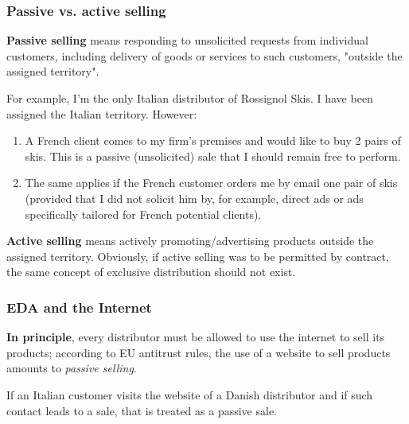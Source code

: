     \subsubsection{Passive vs. active selling}
    
        \textbf{Passive selling} means responding to unsolicited requests from individual customers, including delivery of goods or services to such customers, "outside the assigned territory".
        
        For example, I’m the only Italian distributor of Rossignol Skis. I have been assigned the Italian territory. However:
        
        \begin{enumerate}[label=\alph*.]
            \item A French client comes to my firm’s premises and would like to buy 2 pairs of skis. This is a passive (unsolicited) sale that I should remain free to perform.
            \item The same applies if the French customer orders me by email one pair of skis (provided that I did not solicit him by, for example, direct ads or ads specifically tailored for French potential clients).
        \end{enumerate}
        
        \medskip

\noindent
        \textbf{Active selling} means actively promoting/advertising products outside the assigned territory. Obviously, if active selling was to be permitted by contract, the same concept of exclusive distribution should not exist.
        
        
    \subsubsection{EDA and the Internet}

        \textbf{In principle}, every distributor must be allowed to use the internet to sell its products; according to EU antitrust rules, the use of a website to sell products amounts to \emph{passive selling}.
        
        If an Italian customer visits the website of a Danish distributor and if such contact leads to a sale, that is treated as a passive sale.
        
